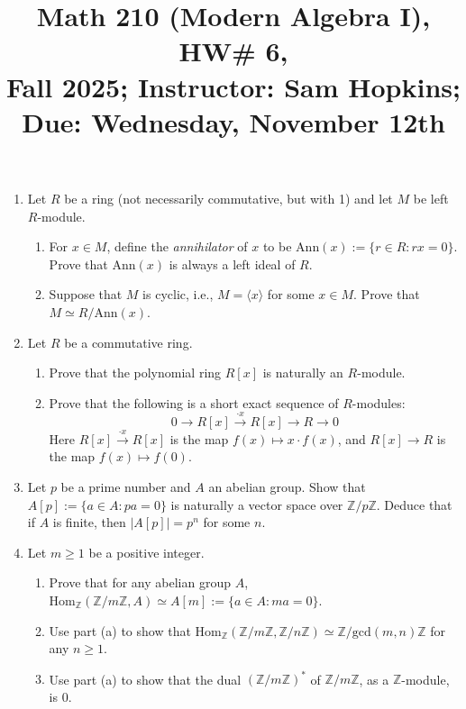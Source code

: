 \documentclass[11pt]{article}
\title{Math 210 (Modern Algebra I), HW\# 6, \\ {\normalsize Fall 2025; Instructor: Sam Hopkins; Due: Wednesday, November 12th}}
\date{}
\begin{document}
\maketitle

\thispagestyle{empty}

\begin{enumerate}

\item Let $R$ be a ring (not necessarily commutative, but with 1) and let $M$ be left $R$-module. 
\begin{enumerate}
\item For $x \in M$, define the \emph{annihilator} of $x$ to be $\mathrm{Ann}(x) := \{r \in R\colon rx = 0\}$. Prove that $\mathrm{Ann}(x)$ is always a left ideal of $R$.
\item Suppose that $M$ is cyclic, i.e., $M = \langle x \rangle$ for some $x \in M$. Prove that $M \simeq R/\mathrm{Ann}(x)$.
\end{enumerate}

\item Let $R$ be a commutative ring.
\begin{enumerate}
\item Prove that the polynomial ring $R[x]$ is naturally an $R$-module.
\item Prove that the following is a short exact sequence of $R$-modules:
\[ 0 \to R[x] \xrightarrow{\cdot x} R[x] \to R \to 0 \]
Here $R[x] \xrightarrow{\cdot x} R[x]$ is the map $f(x) \mapsto x \cdot f(x)$, and $R[x] \to R$ is the map $f(x) \mapsto f(0)$.
\end{enumerate}

\item Let $p$ be a prime number and $A$ an abelian group. Show that $A[p] := \{a \in A\colon pa = 0\}$ is naturally a vector space over $\mathbb{Z}/p\mathbb{Z}$. Deduce that if $A$ is finite, then $|A[p]| = p^n$ for some $n$.

\item Let $m \geq 1$ be a positive integer.
\begin{enumerate} 
\item Prove that for any abelian group $A$, $\mathrm{Hom}_{\mathbb{Z}}(\mathbb{Z}/m\mathbb{Z},A) \simeq A[m] := \{a \in A\colon ma = 0\}$.
\item Use part (a) to show that $\mathrm{Hom}_{\mathbb{Z}}(\mathbb{Z}/m\mathbb{Z}, \mathbb{Z}/n\mathbb{Z}) \simeq \mathbb{Z}/\mathrm{gcd}(m,n)\mathbb{Z}$ for any $n \geq 1$.
\item Use part (a) to show that the dual $(\mathbb{Z}/m\mathbb{Z})^*$ of $\mathbb{Z}/m\mathbb{Z}$, as a $\mathbb{Z}$-module, is $0$.
\end{enumerate}


\end{enumerate}
\end{document}
